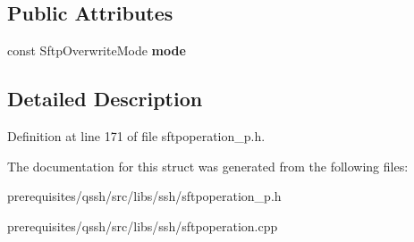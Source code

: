 \subsection*{Public Attributes}
\begin{DoxyCompactItemize}
\item 
\mbox{\label{struct_q_ssh_1_1_internal_1_1_sftp_create_file_a702478f7675a37caa12578a3ae55b893}} 
const Sftp\+Overwrite\+Mode {\bfseries mode}
\end{DoxyCompactItemize}


\subsection{Detailed Description}


Definition at line 171 of file sftpoperation\+\_\+p.\+h.



The documentation for this struct was generated from the following files\+:\begin{DoxyCompactItemize}
\item 
prerequisites/qssh/src/libs/ssh/sftpoperation\+\_\+p.\+h\item 
prerequisites/qssh/src/libs/ssh/sftpoperation.\+cpp\end{DoxyCompactItemize}
